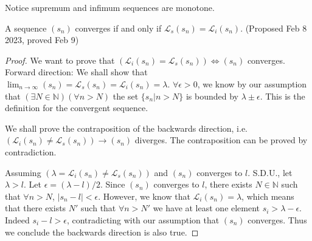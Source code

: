 \documentclass[../note.tex]{subfiles}
\begin{document}
\begin{remark}
	Notice supremum and infimum sequences are monotone.
\end{remark}
\begin{theorem} \label{analysis:th:Convergence_and_limit_of_sup_in}
	A sequence $(s_n)$ converges if and only if $\mathcal{L}_s (s_n) = \mathcal{L}_i(s_n)$. 
	(Proposed Feb 8 2023, proved Feb 9)
\end{theorem}

\begin{proof}
We want to prove that $(\mathcal{L}_i (s_n) = \mathcal{L}_s (s_n)) \iff (s_n)$ converges. \\
Forward direction: We shall show that $\lim_{n\to \infty}(s_n)=\mathcal{L}_s(s_n) = \mathcal{L}_i (s_n) = \lambda$. $\forall \epsilon >0$, we know by our assumption that $(\exists N \in \mathbb{N})(\forall n>N)$ the set $\{s_n|n>N\}$ is bounded by $\lambda \pm \epsilon.$ This is the definition for the convergent sequence. 

We shall prove the contraposition of the backwards direction, i.e. $ (\mathcal{L}_i (s_n) \neq \mathcal{L}_s (s_n)) \rightarrow (s_n)$ diverges.
The contraposition can be proved by contradiction. 

Assuming $ (\lambda = \mathcal{L}_i (s_n) \neq \mathcal{L}_s (s_n))$ and $ (s_n)$ converges to $l$. S.D.U., let $\lambda > l$. 
Let $\epsilon = (\lambda - l)/2$. 
Since $(s_n)$ converges to $l$, there exists $N \in \mathbb{N}$ such that $\forall n>N$, $|s_n - l| < \epsilon$. 
However, we know that $\mathcal{L}_i (s_n) = \lambda$, which means that there exists $N'$ such that $\forall n>N'$ we have at least one element $s_i > \lambda - \epsilon$. Indeed $s_i - l>\epsilon$, contradicting with our assumption that $(s_n)$ converges. Thus we conclude the backwards direction is also true.
\end{proof}


\end{document}
